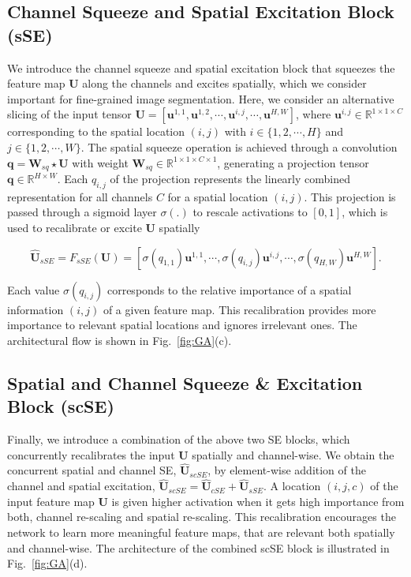 \documentclass{llncs}
\begin{document}
\vspace{-2mm}
\subsection{Channel Squeeze and Spatial Excitation Block (sSE)}
We introduce the channel squeeze and spatial excitation block that squeezes the feature map $\mathbf{U}$ along the channels and excites spatially, which we consider important for fine-grained image segmentation. Here, we consider an alternative slicing of the input tensor $\mathbf{U} = [\mathbf{u}^{1,1}, \mathbf{u}^{1,2}, \cdots, \mathbf{u}^{i,j}, \cdots ,\mathbf{u}^{H,W}]$, where $\mathbf{u}^{i,j} \in \mathbb{R}^{1 \times 1 \times C}$ corresponding to the spatial location $(i,j)$ with $i \in \{1, 2, \cdots, H\}$ and $j \in \{1, 2, \cdots, W\}$. The spatial squeeze operation is achieved through a convolution $\mathbf{q} = \mathbf{W}_{sq} \star \mathbf{U}$ with weight $\mathbf{W}_{sq} \in \mathbb{R}^{1 \times 1 \times C \times 1}$, generating a projection tensor $\mathbf{q} \in \mathbb{R}^{H \times W}$. Each $q_{i,j}$ of the projection represents the linearly combined representation for all channels $C$ for a spatial location $(i,j)$. This projection is passed through a sigmoid layer $\sigma(.)$ to rescale activations to $[0,1]$, which is used to recalibrate or excite $\mathbf{U}$ spatially

\begin{equation}
\hat{\mathbf{U}}_{sSE} = F_{sSE}(\mathbf{U}) = [\sigma(q_{1,1})\mathbf{u}^{1,1}, \cdots, \sigma(q_{i,j})\mathbf{u}^{i,j}, \cdots, \sigma(q_{H,W})\mathbf{u}^{H,W}].
\end{equation}

\noindent
Each value $\sigma(q_{i,j})$ corresponds to the relative importance of a spatial information $(i,j)$ of a given feature map. This recalibration provides more importance to relevant spatial locations and ignores irrelevant ones. The architectural flow is shown in Fig.~\ref{fig:GA}(c). 

\noindent
\subsection{Spatial and Channel Squeeze \& Excitation Block (scSE)}
Finally, we introduce a combination of the above two SE blocks, which concurrently recalibrates the input $\mathbf{U}$ spatially and channel-wise. We obtain the concurrent spatial and channel SE, $\hat{\mathbf{U}}_{scSE}$, by element-wise addition of the channel and spatial excitation, $\hat{\mathbf{U}}_{scSE} = \hat{\mathbf{U}}_{cSE} + \hat{\mathbf{U}}_{sSE}$. A location $(i,j,c)$ of the input feature map $\mathbf{U}$ is given higher activation when it gets high importance from both, channel re-scaling and spatial re-scaling. This recalibration encourages the network to learn more meaningful feature maps, that are relevant both spatially and channel-wise. The architecture of the combined scSE block is illustrated in Fig.~\ref{fig:GA}(d).
\end{document}

